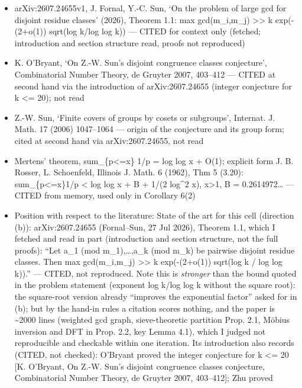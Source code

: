 \documentclass[11pt,a4paper]{article}
\providecommand{\tightlist}{\setlength{\itemsep}{0pt}\setlength{\parskip}{0pt}}
\begin{document}
\begin{itemize}
\tightlist
\item
  arXiv:2607.24655v1, J. Fornal, Y.-C. Sun, `On the problem of large gcd
  for disjoint residue classes' (2026), Theorem 1.1: max gcd(m\_i,m\_j)
  \textgreater\textgreater{} k exp(-(2+o(1)) sqrt(log k/log log k)) ---
  CITED for context only (fetched; introduction and section structure
  read, proofs not reproduced)
\item
  K. O'Bryant, `On Z.-W. Sun's disjoint congruence classes conjecture',
  Combinatorial Number Theory, de Gruyter 2007, 403--412 --- CITED at
  second hand via the introduction of arXiv:2607.24655 (integer
  conjecture for k \textless= 20); not read
\item
  Z.-W. Sun, `Finite covers of groups by cosets or subgroups', Internat.
  J. Math. 17 (2006) 1047--1064 --- origin of the conjecture and its
  group form; cited at second hand via arXiv:2607.24655, not read
\item
  Mertens' theorem, sum\_\{p\textless=x\} 1/p = log log x + O(1);
  explicit form J. B. Rosser, L. Schoenfeld, Illinois J. Math. 6 (1962),
  Thm 5 (3.20): sum\_\{p\textless=x\}1/p \textless{} log log x + B +
  1/(2 log\^{}2 x), x\textgreater1, B = 0.2614972\ldots{} --- CITED from
  memory, used only in Corollary 6(2)
\item
  Position with respect to the literature: State of the art for this
  cell (direction (b)): arXiv:2607.24655 (Fornal--Sun, 27 Jul 2026),
  Theorem 1.1, which I fetched and read in part (introduction and
  section structure, not the full proofs): ``Let a\_1 (mod
  m\_1),\ldots,a\_k (mod m\_k) be pairwise disjoint residue classes.
  Then max gcd(m\_i,m\_j) \textgreater\textgreater{} k exp(-(2+o(1))
  sqrt(log k / log log k)).'' --- CITED, not reproduced. Note this is
  \emph{stronger} than the bound quoted in the problem statement
  (exponent log k/log log k without the square root): the square-root
  version already ``improves the exponential factor'' asked for in (b);
  but by the hand-in rules a citation scores nothing, and the paper is
  \textasciitilde2000 lines (weighted gcd graph, sieve-theoretic
  partition Prop. 2.1, Möbius inversion and DFT in Prop. 2.2, key Lemma
  4.1), which I judged not reproducible and checkable within one
  iteration. Its introduction also records (CITED, not checked):
  O'Bryant proved the integer conjecture for k \textless= 20 {[}K.
  O'Bryant, On Z.-W. Sun's disjoint congruence classes conjecture,
  Combinatorial Number Theory, de Gruyter 2007, 403--412{]}; Zhu proved

\end{itemize}
\end{document}
